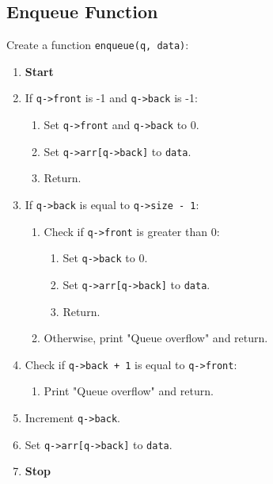 {  \subsection{Enqueue Function}
  Create a function \texttt{enqueue(q, data)}:
  \begin{enumerate}[label=\arabic*:,left=0pt]
    \item \textbf{Start}
    \item If \texttt{q->front} is -1 and \texttt{q->back} is -1:
          \begin{enumerate}[label=2.\arabic*.]
            \item Set \texttt{q->front} and \texttt{q->back} to 0.
            \item Set \texttt{q->arr[q->back]} to \texttt{data}.
            \item Return.
          \end{enumerate}
    \item If \texttt{q->back} is equal to \texttt{q->size - 1}:
          \begin{enumerate}[label=2.\arabic*.]
            \item Check if \texttt{q->front} is greater than 0:
                  \begin{enumerate}[label=3.\arabic*.]
                    \item Set \texttt{q->back} to 0.
                    \item Set \texttt{q->arr[q->back]} to \texttt{data}.
                    \item Return.
                  \end{enumerate}
            \item Otherwise, print "Queue overflow" and return.
          \end{enumerate}
    \item Check if \texttt{q->back + 1} is equal to \texttt{q->front}:
          \begin{enumerate}[label=2.\arabic*.]
            \item Print "Queue overflow" and return.
          \end{enumerate}
    \item Increment \texttt{q->back}.
    \item Set \texttt{q->arr[q->back]} to \texttt{data}.
    \item \textbf{Stop}
  \end{enumerate}

}
